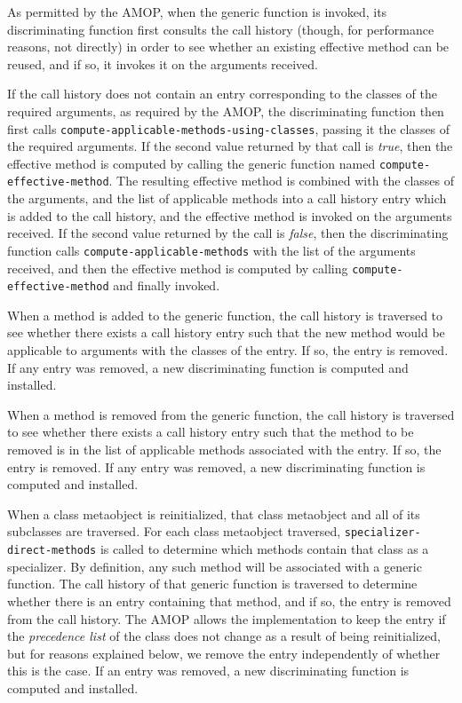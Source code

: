 As permitted by the AMOP, when the generic function is invoked, its
discriminating function first consults the call history (though, for
performance reasons, not directly) in order to see whether an existing
effective method can be reused, and if so, it invokes it on the
arguments received.

If the call history does not contain an entry corresponding to the
classes of the required arguments, as required by the AMOP, the
discriminating function then first calls
\texttt{compute-applicable-methods-using-classes}, passing it the
classes of the required arguments.  If the second value returned by
that call is \textit{true}, then the effective method is computed by
calling the generic function named \texttt{compute-effective-method}.
The resulting effective method is combined with the classes of the
arguments, and the list of applicable methods into a call history
entry which is added to the call history, and the effective method is
invoked on the arguments received.  If the second value returned by
the call is \textit{false}, then the discriminating function calls
\texttt{compute-applicable-methods} with the list of the arguments
received, and then the effective method is computed by calling
\texttt{compute-effective-method} and finally invoked.

When a method is added to the generic function, the call history is
traversed to see whether there exists a call history entry such that
the new method would be applicable to arguments with the classes of
the entry.  If so, the entry is removed.  If any entry was removed, a
new discriminating function is computed and installed. 

When a method is removed from the generic function, the call history
is traversed to see whether there exists a call history entry such
that the method to be removed is in the list of applicable methods
associated with the entry.  If so, the entry is removed. If any entry
was removed, a new discriminating function is computed and installed.

When a class metaobject is reinitialized, that class metaobject and
all of its subclasses are traversed.  For each class metaobject
traversed, \texttt{specializer-direct-methods} is called to determine
which methods contain that class as a specializer.  By definition, any
such method will be associated with a generic function.  The call
history of that generic function is traversed to determine whether
there is an entry containing that method, and if so, the entry is
removed from the call history.  The AMOP allows the implementation to
keep the entry if the \emph{precedence list} of the class does not
change as a result of being reinitialized, but for reasons explained
below, we remove the entry independently of whether this is the case.
If an entry was removed, a new discriminating function is computed and
installed.

